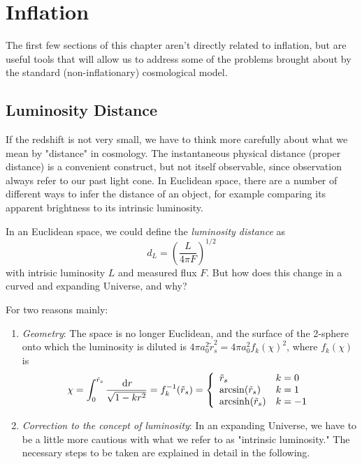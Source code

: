 \chapter{Inflation} \label{ch:vi}

The first few sections of this chapter aren't directly related to inflation, but are useful tools that will allow us to address some of the problems brought about by the standard (non-inflationary) cosmological model.

\section{Luminosity Distance}

If the redshift is not very small, we have to think more carefully about what we mean by "distance" in cosmology. The instantaneous physical distance (proper distance) is a convenient construct, but not itself observable, since observation always refer to our past light cone. In Euclidean space, there are a number of different ways to infer the distance of an object, for example comparing its apparent brightness to its intrinsic luminosity.
\par In an Euclidean space, we could define the \emph{luminosity distance} as
\begin{equation*}
    d_{L} = \left(\frac{L}{4\pi F}\right)^{1/2}
\end{equation*}
with intrisic luminosity $L$ and measured flux $F$. But how does this change in a curved and expanding Universe, and why?
\par For two reasons mainly:
\begin{enumerate}
    \item \emph{Geometry}: The space is no longer Euclidean, and the surface of the 2-sphere onto which the luminosity is diluted is $4\pi a_{0}^{2}\tilde{r}_{s}^{2} = 4\pi a_{0}^{2}f_{k}(\chi)^{2}$, where $f_{k}(\chi)$ is 
    \begin{equation}
        \chi = \int_{0}^{\tilde{r}_{s}}\frac{\,\text{d}r}{\sqrt{1-kr^{2}}} = f_{k}^{-1}(\tilde{r}_{s}) = \left\{
            \begin{array}{ll}
                \tilde{r}_{s} & k=0\\
                \arcsin(\tilde{r}_{s}) & k=1\\
                \text{arcsinh}(\tilde{r}_{s}) & k=-1
            \end{array}
        \right.
    \end{equation}
    \item \emph{Correction to the concept of luminosity}: In an expanding Universe, we have to be a little more cautious with what we refer to as "intrinsic luminosity." The necessary steps to be taken are explained in detail in the following.
\end{enumerate}
